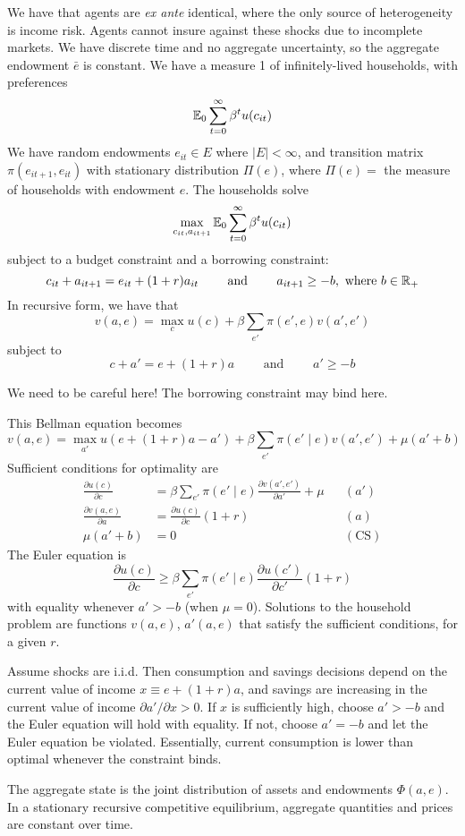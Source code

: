 \documentclass[10pt]{article}
\begin{document}
\begin{model} 
	 We have that agents are \emph{ex ante} identical, where the only source of heterogeneity is income risk. Agents cannot insure against these shocks due to incomplete markets. We have discrete time and no aggregate uncertainty, so the aggregate endowment $\bar{e}$ is constant. We have a measure 1 of infinitely-lived households, with preferences \[\mathbb{E}_0 \sum_{t=0}^\infty \beta^t u(c_{it})\]We have random endowments $e_{it} \in E$ where $|E|<\infty$, and transition matrix $\pi(e_{it+1},e_{it})$ with stationary distribution $\Pi(e)$, where $\Pi(e) = $ the measure of households with endowment $e$. The households solve \[\max_{c_{it},a_{it+1}}\mathbb{E}_0 \sum_{t=0}^\infty \beta^t u(c_{it})\]subject to a budget constraint and a borrowing constraint:\[c_{it} + a_{it+1} = e_{it} + (1+r)a_{it} \qquad \text{ and } \qquad a_{it+1} \ge -b,\text{ where } b \in \mathbb{R}_+\]In recursive form, we have that \[v(a,e) = \max_c u(c) + \beta \sum_{e'} \pi(e',e)v(a',e')\]subject to \[c + a' = e + (1+r)a \qquad \text{ and } \qquad a' \ge -b\]
	\begin{remark}
		We need to be careful here! The borrowing constraint may bind here.
	\end{remark}
	This Bellman equation becomes \[v(a,e) = \max_{a'} u(e + (1+r)a - a')+ \beta \sum_{e'} \pi(e' \mid e)v(a',e') + \mu(a' + b)\]Sufficient conditions for optimality are\begin{align*}
		\frac{\partial u(c)}{\partial c} &= \beta \sum_{e'} \pi(e' \mid e) \frac{\partial v(a',e')}{\partial a'} + \mu &&(a') \\
		\frac{\partial v(a,e)}{\partial a} &= \frac{\partial u(c)}{\partial c}(1+r) &&(a)\\ \mu(a' + b) &= 0 &&(\text{CS})
	\end{align*}
	The Euler equation is \[\frac{\partial u(c)}{\partial c} \ge \beta \sum_{e'} \pi(e' \mid e) \frac{\partial u(c')}{\partial c'}(1+r)\]with equality whenever $a' > -b$ (\ie when $\mu = 0$). Solutions to the household problem are functions $v(a,e)$, $a'(a,e)$ that satisfy the sufficient conditions, for a given $r$.
	
	Assume shocks are i.i.d. Then consumption and savings decisions depend on the current value of income $x \equiv e + (1+r)a$, and savings are increasing in the current value of income $\partial a' / \partial x > 0$. If $x$ is sufficiently high, choose $a' > -b$ and the Euler equation will hold with equality. If not, choose $a' = -b$ and let the Euler equation be violated. Essentially, current consumption is lower than optimal whenever the constraint binds.
	
	The aggregate state is the joint distribution of assets and endowments $\Phi(a,e)$. In a stationary recursive competitive equilibrium, aggregate quantities and prices are constant over time. 
\end{model}
\end{document}
